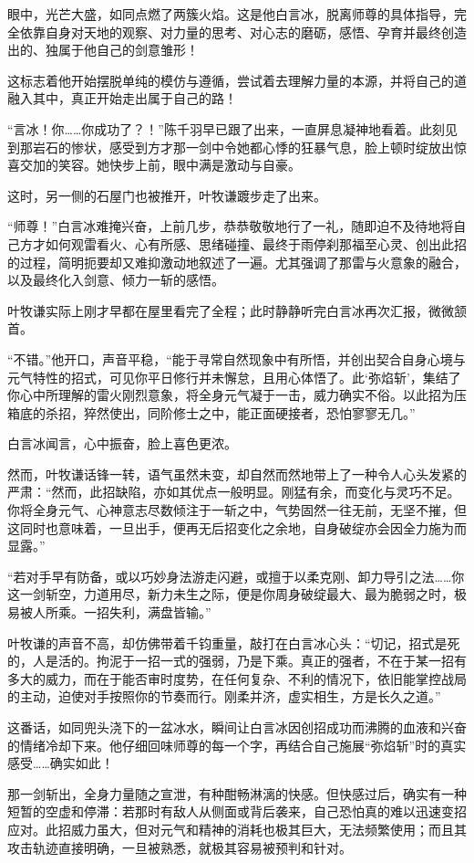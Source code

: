 眼中，光芒大盛，如同点燃了两簇火焰。这是他白言冰，脱离师尊的具体指导，完全依靠自身对天地的观察、对力量的思考、对心志的磨砺，感悟、孕育并最终创造出的、独属于他自己的剑意雏形！

这标志着他开始摆脱单纯的模仿与遵循，尝试着去理解力量的本源，并将自己的道融入其中，真正开始走出属于自己的路！

“言冰！你……你成功了？！”陈千羽早已跟了出来，一直屏息凝神地看着。此刻见到那岩石的惨状，感受到方才那一剑中令她都心悸的狂暴气息，脸上顿时绽放出惊喜交加的笑容。她快步上前，眼中满是激动与自豪。

这时，另一侧的石屋门也被推开，叶牧谦踱步走了出来。

“师尊！”白言冰难掩兴奋，上前几步，恭恭敬敬地行了一礼，随即迫不及待地将自己方才如何观雷看火、心有所感、思绪碰撞、最终于雨停刹那福至心灵、创出此招的过程，简明扼要却又难抑激动地叙述了一遍。尤其强调了那雷与火意象的融合，以及最终化入剑意、倾力一斩的感悟。

叶牧谦实际上刚才早都在屋里看完了全程；此时静静听完白言冰再次汇报，微微颔首。

“不错。”他开口，声音平稳，“能于寻常自然现象中有所悟，并创出契合自身心境与元气特性的招式，可见你平日修行并未懈怠，且用心体悟了。此‘弥焰斩’，集结了你心中所理解的雷火刚烈意象，将全身元气凝于一击，威力确实不俗。以此招为压箱底的杀招，猝然使出，同阶修士之中，能正面硬接者，恐怕寥寥无几。”

白言冰闻言，心中振奋，脸上喜色更浓。

然而，叶牧谦话锋一转，语气虽然未变，却自然而然地带上了一种令人心头发紧的严肃：“然而，此招缺陷，亦如其优点一般明显。刚猛有余，而变化与灵巧不足。你将全身元气、心神意志尽数倾注于一斩之中，气势固然一往无前，无坚不摧，但这同时也意味着，一旦出手，便再无后招变化之余地，自身破绽亦会因全力施为而显露。”

“若对手早有防备，或以巧妙身法游走闪避，或擅于以柔克刚、卸力导引之法……你这一剑斩空，力道用尽，新力未生之际，便是你周身破绽最大、最为脆弱之时，极易被人所乘。一招失利，满盘皆输。”

叶牧谦的声音不高，却仿佛带着千钧重量，敲打在白言冰心头：“切记，招式是死的，人是活的。拘泥于一招一式的强弱，乃是下乘。真正的强者，不在于某一招有多大的威力，而在于能否审时度势，在任何复杂、不利的情况下，依旧能掌控战局的主动，迫使对手按照你的节奏而行。刚柔并济，虚实相生，方是长久之道。”

这番话，如同兜头浇下的一盆冰水，瞬间让白言冰因创招成功而沸腾的血液和兴奋的情绪冷却下来。他仔细回味师尊的每一个字，再结合自己施展“弥焰斩”时的真实感受……确实如此！

那一剑斩出，全身力量随之宣泄，有种酣畅淋漓的快感。但快感过后，确实有一种短暂的空虚和停滞：若那时有敌人从侧面或背后袭来，自己恐怕真的难以迅速变招应对。此招威力虽大，但对元气和精神的消耗也极其巨大，无法频繁使用；而且其攻击轨迹直接明确，一旦被熟悉，就极其容易被预判和针对。

